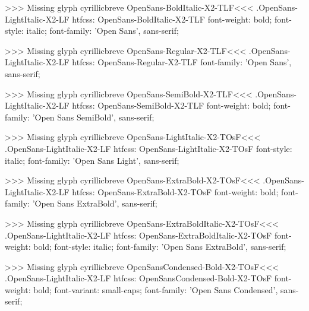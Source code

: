 >>>
Missing glyph	cyrillicbreve
\<OpenSans-BoldItalic-X2-TLF\><<<
.OpenSans-LightItalic-X2-LF
htfcss:  OpenSans-BoldItalic-X2-TLF  font-weight: bold; font-style: italic; font-family: 'Open Sans', sans-serif;

>>>
Missing glyph	cyrillicbreve
\<OpenSans-Regular-X2-TLF\><<<
.OpenSans-LightItalic-X2-LF
htfcss:  OpenSans-Regular-X2-TLF  font-family: 'Open Sans', sans-serif;

>>>
Missing glyph	cyrillicbreve
\<OpenSans-SemiBold-X2-TLF\><<<
.OpenSans-LightItalic-X2-LF
htfcss:  OpenSans-SemiBold-X2-TLF  font-weight: bold; font-family: 'Open Sans SemiBold', sans-serif;

>>>
Missing glyph	cyrillicbreve
\<OpenSans-LightItalic-X2-TOsF\><<<
.OpenSans-LightItalic-X2-LF
htfcss:  OpenSans-LightItalic-X2-TOsF  font-style: italic; font-family: 'Open Sans Light', sans-serif;

>>>
Missing glyph	cyrillicbreve
\<OpenSans-ExtraBold-X2-TOsF\><<<
.OpenSans-LightItalic-X2-LF
htfcss:  OpenSans-ExtraBold-X2-TOsF  font-weight: bold; font-family: 'Open Sans ExtraBold', sans-serif;

>>>
Missing glyph	cyrillicbreve
\<OpenSans-ExtraBoldItalic-X2-TOsF\><<<
.OpenSans-LightItalic-X2-LF
htfcss:  OpenSans-ExtraBoldItalic-X2-TOsF  font-weight: bold; font-style: italic; font-family: 'Open Sans ExtraBold', sans-serif;

>>>
Missing glyph	cyrillicbreve
\<OpenSansCondensed-Bold-X2-TOsF\><<<
.OpenSans-LightItalic-X2-LF
htfcss:  OpenSansCondensed-Bold-X2-TOsF  font-weight: bold; font-variant: small-caps; font-family: 'Open Sans Condensed', sans-serif;

